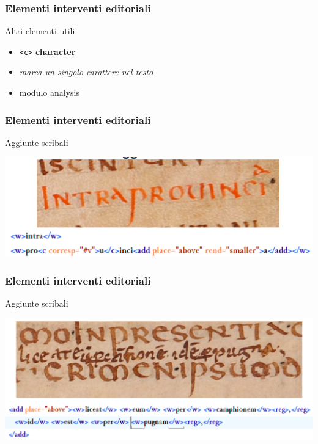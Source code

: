 \begin{frame}
    \frametitle{Elementi interventi editoriali}
    \addtocounter{nframe}{1}
    
    \begin{block}{Altri elementi utili}
        \begin{itemize}
            \item \texttt{<c>} \textbf{character}
            \item[] \textit{marca un singolo carattere nel testo}
            \item[] modulo analysis
        \end{itemize}
        
    \end{block}
    
\end{frame} 


\begin{frame}
    \frametitle{Elementi interventi editoriali}
    \addtocounter{nframe}{1}
    
   
    \begin{block}{Aggiunte scribali}
        \begin{center}
            \includegraphics[width=.95\textwidth]{imgs/Aggiunte-1.png}
        \end{center}

    \end{block}
    
\end{frame} 

\begin{frame}
    \frametitle{Elementi interventi editoriali}
    \addtocounter{nframe}{1}
    
   
    \begin{block}{Aggiunte scribali}
        \begin{center}
            \includegraphics[width=.95\textwidth]{imgs/Aggiunte-2.png}
        \end{center}

    \end{block}
    
\end{frame} 


